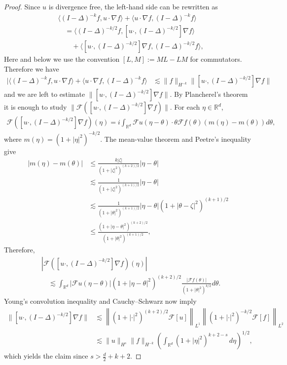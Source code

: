 \documentclass[a4paper,10pt]{amsart}
\newcommand{\R}{\mathbb{R}}
\theoremstyle{remark}
\numberwithin{equation}{section}
\begin{document}
\begin{proof}
    Since $u$ is divergence free, the left-hand side can be rewritten as
    \begin{align*}
    &\langle(I-\Delta)^{-k}f,u\cdot\nabla f\rangle
    +\langle u\cdot\nabla f,(I-\Delta)^{-k}f\rangle\\
    &\quad=\langle (I-\Delta)^{-k/2}f,
    [u\cdot,(I-\Delta)^{-k/2}]\nabla f\rangle\\
    &\qquad+\langle [u\cdot,(I-\Delta)^{-k/2}]\nabla f,
    (I-\Delta)^{-k/2}f\rangle,
    \end{align*}
    Here and below we use the convention $[L,M]:=ML-LM$ for commutators.
    Therefore we have
    \begin{align*}
        |\langle(I-\Delta)^{-k}f,u\cdot\nabla f\rangle+\langle u\cdot\nabla f ,(I-\Delta)^{-k}f\rangle&\lesssim \|f\|_{H^{-k}}\|[u\cdot,(I-\Delta)^{-k/2}]\nabla f\|
    \end{align*}
    and we are left to estimate $\|[u\cdot,(I-\Delta)^{-k/2}]\nabla f\|$. By Plancherel's theorem it is enough to study $\|\mathscr{F}\left([u\cdot,(I-\Delta)^{-k/2}]\nabla f\right)\|$. For each $\eta\in \R^d$,
    \begin{align*}
      \mathscr{F}\left([u\cdot,(I-\Delta)^{-k/2}]\nabla f\right)(\eta)=i\int_{\R^d} \mathscr{F}u(\eta-\theta)\cdot\theta \mathscr{F}f(\theta)\left(m(\eta)-m(\theta)\right)d\theta, 
    \end{align*}
    where $m(\eta)=(1+|\eta|^2)^{-k/2}$. The mean-value theorem and
    Peetre's inequality give
   \begin{align*}
        |m(\eta)-m(\theta)|&\leq \frac{k|\zeta|} {(1+|\zeta|^2)^{(k+2)/2}}|\eta-\theta|\\ & \lesssim \frac{1}{(1+|\zeta|^2)^{(k+1)/2}}|\eta-\theta|\\ & \lesssim \frac{1}{(1+|\theta|^2)^{(k+1)/2}}|\eta-\theta|(1+|\theta-\zeta|^2)^{(k+1)/2}\\ &\leq \frac{(1+|\eta-\theta|^2)^{(k+2)/2}}{(1+|\theta|^2)^{(k+1)/2}},
    \end{align*}
    Therefore,
    \begin{align*}
        &\left|\mathscr{F}\left([u\cdot,(I-\Delta)^{-k/2}]
        \nabla f\right)(\eta)\right|\\
        &\quad\lesssim \int_{\R^d}|\mathscr{F}u(\eta-\theta)|
        (1+|\eta-\theta|^2)^{(k+2)/2}
        \frac{|\mathscr{F}f(\theta)|}{(1+|\theta|^2)^{k/2}}d\theta.
    \end{align*}
    Young's convolution inequality and Cauchy--Schwarz now imply
    \begin{align*}
        \|[u\cdot,(I-\Delta)^{-k/2}]\nabla f\|
        &\lesssim
        \left\|(1+|\cdot|^2)^{(k+2)/2}\mathscr{F}[u]\right\|_{L^1}
        \left\|(1+|\cdot|^2)^{-k/2}\mathscr{F}[f]\right\|_{L^2}\\
        &\lesssim \|u\|_{H^s}\|f\|_{H^{-k}}
        \left(\int_{\R^d}
        (1+|\eta|^2)^{k+2-s}\,d\eta\right)^{1/2},
    \end{align*}
    which yields the claim since $s>\frac{d}{2}+k+2$.
\end{proof}
\end{document}
